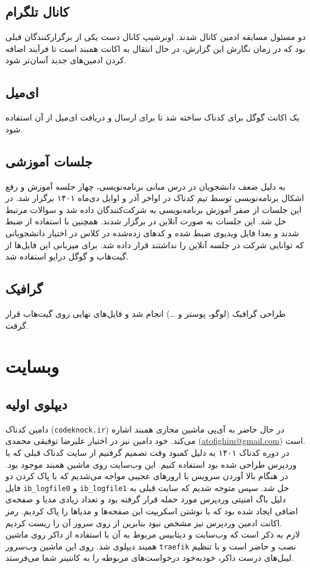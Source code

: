 \documentclass{report}
\begin{document}
\subsection{کانال تلگرام}
دو مسئول مسابقه ادمین کانال شدند. اونرشیپ کانال دست یکی از برگزارکنندگان قبلی بود که در زمان نگارش این گزارش، در حال انتقال به اکانت همبند است تا فرآیند اضافه کردن ادمین‌های جدید آسان‌تر شود.

\subsection{ای‌میل}
یک اکانت گوگل برای کدناک ساخته شد تا برای ارسال و دریافت ای‌میل از آن استفاده شود.

\subsection{جلسات آموزشی}
به دلیل ضعف دانشجویان در درس مبانی برنامه‌نویسی، چهار جلسه آموزش و رفع اشکال برنامه‌نویسی توسط تیم کدناک در اواخر آذر و اوایل دی‌ماه ۱۴۰۱ برگزار شد. در این جلسات از صفر آموزش برنامه‌نویسی به شرکت‌کنندگان داده شد و سوالات مرتبط حل شد. این جلسات به صورت آنلاین در  برگزار شدند. همچنین با استفاده از  ضبط شدند و بعدا فایل ویدیوی ضبط شده‌ و کدهای زده‌شده در کلاس در اختیار دانشجویانی که توانایی شرکت در جلسه آنلاین را نداشتند قرار داده شد. برای میزبانی این فایل‌ها از گیت‌هاب و گوگل درایو استفاده شد.

\subsection{گرافیک}
طراحی گرافیک (لوگو، پوستر و \dots) انجام شد و فایل‌های نهایی روی گیت‌هاب قرار گرفت.

\section{وبسایت}
\subsection{دیپلوی اولیه}
دامین کدناک (\verb|codeknock.ir|) در حال حاضر به آی‌پی ماشین مجازی همبند اشاره می‌کند. خود دامین نیز در اختیار علیرضا توفیقی محمدی (\href{mailto:atofighim@gmail.com}{atofighim@gmail.com}) است. \\
در دوره کدناک ۱۴۰۱ به دلیل کمبود وقت تصمیم گرفتیم از سایت کدناک قبلی که با وردپرس طراحی شده بود استفاده کنیم. این وب‌سایت روی ماشین همبند موجود بود. در هنگام بالا آوردن سرویس با ارورهای عجیبی مواجه می‌شدیم که با پاک کردن دو فایل \verb|ib_logfile0| و \verb|ib_logfile1| حل شد. سپس متوجه شدیم که سایت قبلی به دلیل باگ امنیتی وردپرس مورد حمله قرار گرفته بود و تعداد زیادی مدیا و صفحه‌ی اضافی ایجاد شده بود که با نوشتن اسکریپت این صفحه‌ها و مدیاها را پاک کردیم. رمز اکانت ادمین وردپرس نیز مشخص نبود بنابرین از روی سرور آن را ریست کردیم. \\
لازم به ذکر است که وب‌سابت و دیتابیس مربوط به آن با استفاده از داکر روی ماشین همبند دیپلوی شد. روی این ماشین وب‌سرور \verb|traefik| نصب و حاضر است و با تنظیم لیبل‌های درست داکر، خودبه‌خود درخواست‌های مربوطه را به کانتینر شما می‌فرستد.
\end{document}
